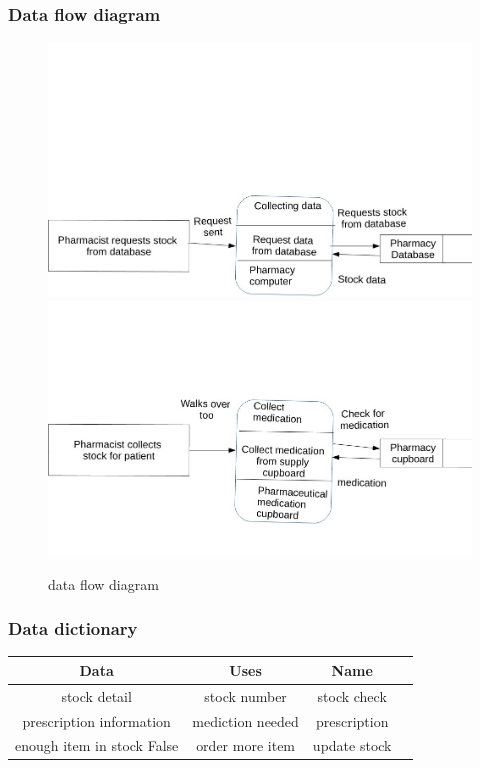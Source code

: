 \subsubsection{Data flow diagram}
\begin{figure}[ht!]
\centering
\includegraphics[trim = 0mm 0mm 0mm 5cm , clip, width=130mm]{dfd2.JPG}
\includegraphics[trim = 0mm 0mm 0mm 5cm , clip, width=130mm]{dfd3.JPG}
\caption{data flow diagram \label{overflow}}
\end{figure}
\subsubsection{Data dictionary}
\begin{table}[h]
\begin{tabular}{|c|c|c|c|}
\hline
Data & Uses & Name \\
\hline
stock detail & stock number & stock check\\
\hline
prescription information & mediction needed & prescription\\
\hline
enough item in stock False & order more item & update stock\\
\hline
\end{tabular}
\label{table:nonlin}
\end{table}

